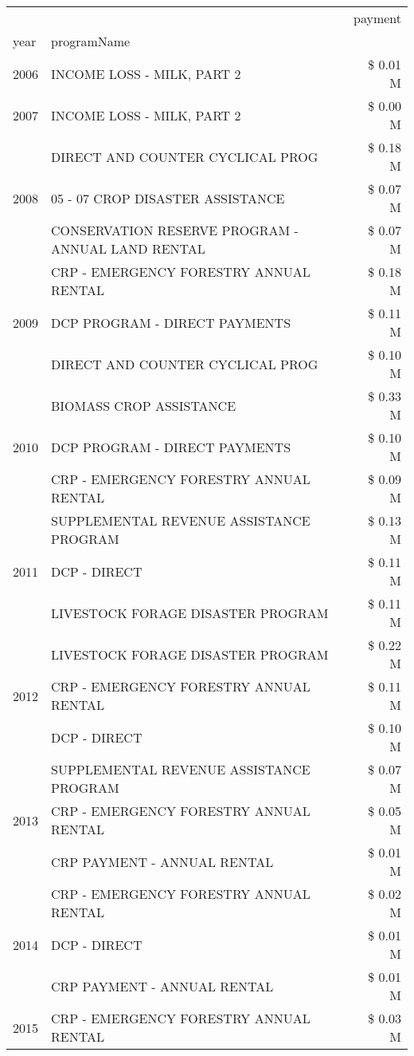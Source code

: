 \begin{tabular}{llr}
\toprule
 &  & payment \\
year & programName &  \\
\midrule
2006 & INCOME LOSS - MILK, PART 2 & \$ 0.01 M \\
\cline{1-3}
2007 & INCOME LOSS - MILK, PART 2 & \$ 0.00 M \\
\cline{1-3}
\multirow[t]{3}{*}{2008} & DIRECT AND COUNTER CYCLICAL PROG & \$ 0.18 M \\
 & 05 - 07 CROP DISASTER ASSISTANCE & \$ 0.07 M \\
 & CONSERVATION RESERVE PROGRAM - ANNUAL LAND RENTAL & \$ 0.07 M \\
\cline{1-3}
\multirow[t]{3}{*}{2009} & CRP - EMERGENCY FORESTRY ANNUAL RENTAL & \$ 0.18 M \\
 & DCP PROGRAM - DIRECT PAYMENTS & \$ 0.11 M \\
 & DIRECT AND COUNTER CYCLICAL PROG & \$ 0.10 M \\
\cline{1-3}
\multirow[t]{3}{*}{2010} & BIOMASS CROP ASSISTANCE & \$ 0.33 M \\
 & DCP PROGRAM - DIRECT PAYMENTS & \$ 0.10 M \\
 & CRP - EMERGENCY FORESTRY ANNUAL RENTAL & \$ 0.09 M \\
\cline{1-3}
\multirow[t]{3}{*}{2011} & SUPPLEMENTAL REVENUE ASSISTANCE PROGRAM & \$ 0.13 M \\
 & DCP - DIRECT & \$ 0.11 M \\
 & LIVESTOCK FORAGE DISASTER PROGRAM & \$ 0.11 M \\
\cline{1-3}
\multirow[t]{3}{*}{2012} & LIVESTOCK FORAGE DISASTER PROGRAM & \$ 0.22 M \\
 & CRP - EMERGENCY FORESTRY ANNUAL RENTAL & \$ 0.11 M \\
 & DCP - DIRECT & \$ 0.10 M \\
\cline{1-3}
\multirow[t]{3}{*}{2013} & SUPPLEMENTAL REVENUE ASSISTANCE PROGRAM & \$ 0.07 M \\
 & CRP - EMERGENCY FORESTRY ANNUAL RENTAL & \$ 0.05 M \\
 & CRP PAYMENT - ANNUAL RENTAL & \$ 0.01 M \\
\cline{1-3}
\multirow[t]{3}{*}{2014} & CRP - EMERGENCY FORESTRY ANNUAL RENTAL & \$ 0.02 M \\
 & DCP - DIRECT & \$ 0.01 M \\
 & CRP PAYMENT - ANNUAL RENTAL & \$ 0.01 M \\
\cline{1-3}
\multirow[t]{3}{*}{2015} & CRP - EMERGENCY FORESTRY ANNUAL RENTAL & \$ 0.03 M \\

\end{tabular}
